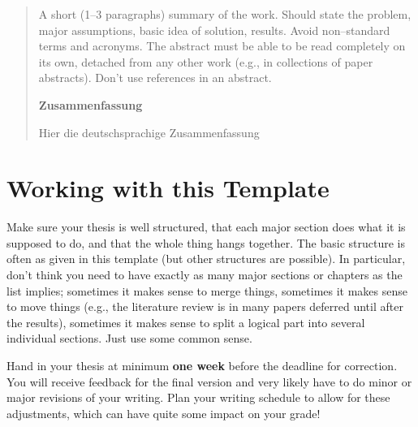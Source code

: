 \documentclass[a4paper,twoside, openright,12pt]{report}
\begin{document}
\newpage


\phantom{u}
\begin{abstract}
  A short (1--3 paragraphs) summary of the work. Should state the problem, major assumptions, basic idea of solution, results. Avoid non--standard terms and acronyms. The abstract must be able to be read completely on its own, detached from any other work (e.g., in collections of paper abstracts). Don't use references in an abstract.
\begin{center}	
\normalsize \textbf{Zusammenfassung}\\
\end{center}
Hier die deutschsprachige Zusammenfassung
\end{abstract}

\newpage

\phantom{u}
\phantom{1}\vspace{6cm}
\begin{center}
\end{center}



\pagestyle{fancy}

\tableofcontents 


\chapter{Working with this Template}

Make sure your thesis is well structured, that each major section does what it is supposed to do, and that the whole thing hangs together. The basic structure is often as given in this template (but other structures are possible). In particular, don't think you need to have exactly as many major sections or chapters as the list implies; sometimes it makes sense to merge things, sometimes it makes sense to move things (e.g., the literature review is in many papers deferred until after the results), sometimes it makes sense to split a logical part into several individual sections. Just use some common sense.

Hand in your thesis at minimum \textbf{one week} before the deadline for correction. You will receive feedback for the final version and very likely have to do minor or major revisions of your writing. Plan your writing schedule to allow for these adjustments, which can have quite some impact on your grade! 
\end{document}
